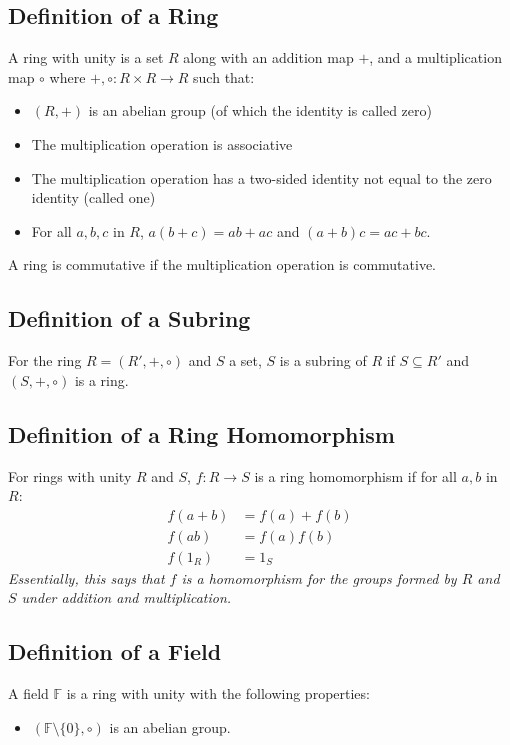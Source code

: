 \documentclass[a4paper, 12pt, twoside]{article}
\begin{document}
\subsection{Definition of a Ring}

A ring with unity is a set $R$ along with an addition map $+$, and
a multiplication map $\circ$ where $+, \circ : R \times R \to R$
such that: \begin{itemize}
  \item $(R, +)$ is an abelian group (of which the identity is called zero)
  \item The multiplication operation is associative
  \item The multiplication operation has a two-sided identity not equal
  to the zero identity (called one)
  \item For all $a, b, c$ in $R$, $a(b+c) = ab + ac$ and $(a+b)c = ac + bc$.
\end{itemize} A ring is commutative if the multiplication operation is commutative.

\subsection{Definition of a Subring}

For the ring $R = (R', +, \circ)$ and $S$ a set, $S$ is a subring
of $R$ if $S \subseteq R'$ and $(S, +, \circ)$ is a ring.

\subsection{Definition of a Ring Homomorphism}

For rings with unity $R$ and $S$, $f : R \to S$ is a ring homomorphism if for all
$a, b$ in $R$: \begin{align*}
  f(a + b) &= f(a) + f(b) \\
  f(ab) &= f(a)f(b) \\
  f(1_R) &= 1_S
\end{align*} \textit{Essentially, this says that $f$ is a homomorphism for the
groups formed by $R$ and $S$ under addition and multiplication.}

\subsection{Definition of a Field}

A field $\mathbb{F}$ is a ring with unity with the following properties: \begin{itemize}
  \item $(\mathbb{F}\setminus\{0\}, \circ)$ is an abelian group.
\end{itemize}
\end{document}

